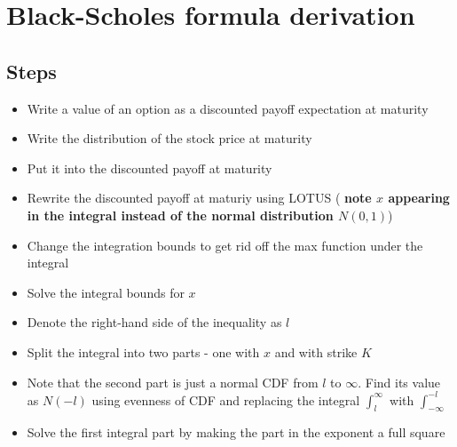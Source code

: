 \chapter{Black-Scholes formula derivation}

\section{Steps}
\begin{itemize}
	\item Write a value of an option as a discounted payoff expectation at maturity
	\item Write the distribution of the stock price at maturity
	\item Put it into the discounted payoff at maturity
	\item Rewrite the discounted payoff at maturiy using LOTUS (\textbf{\color{red} note $x$ appearing in the integral instead of the normal distribution $N(0, 1)$})
	\item Change the integration bounds to get rid off the max function under the integral
	\item Solve the integral bounds for $x$
	\item Denote the right-hand side of the inequality as $l$
	\item Split the integral into two parts - one with $x$ and with strike $K$
	\item Note that the second part is just a normal CDF from $l$ to $\infty$. Find its value as $N(-l)$ using evenness of CDF and replacing the integral $\int_{l}^{\infty}$ with $\int_{-\infty}^{-l}$
	\item Solve the first integral part by making the part in the exponent a full square
\end{itemize}


